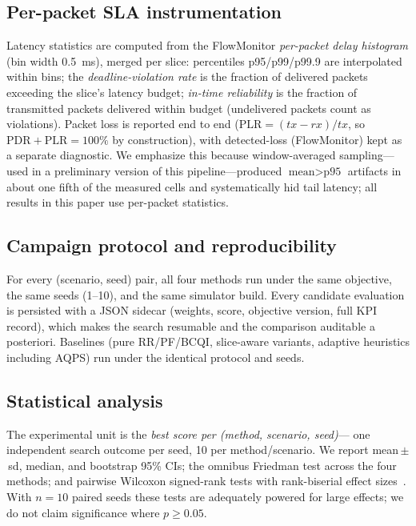 \documentclass[conference]{IEEEtran}
\newif\ifdraftpending
\newcommand{\pending}[1]{%
  \ifdraftpending{\color{red}\textbf{[PENDING-v2: #1]}}\else{}\fi}
\begin{document}
\subsection{Per-packet SLA instrumentation}
Latency statistics are computed from the FlowMonitor \emph{per-packet delay
histogram} (bin width 0.5~ms), merged per slice: percentiles p95/p99/p99.9 are
interpolated within bins; the \emph{deadline-violation rate} is the fraction of
delivered packets exceeding the slice's latency budget; \emph{in-time
reliability} is the fraction of transmitted packets delivered within budget
(undelivered packets count as violations). Packet loss is reported end to end
($\mathrm{PLR} = (tx - rx)/tx$, so $\mathrm{PDR} + \mathrm{PLR} = 100\%$ by
construction), with detected-loss (FlowMonitor) kept as a separate diagnostic.
We emphasize this because window-averaged sampling---used in a preliminary
version of this pipeline---produced $\text{mean} > \text{p95}$ artifacts in
about one fifth of the measured cells and systematically hid tail latency; all
results in this paper use per-packet statistics.

\subsection{Campaign protocol and reproducibility}
For every (scenario, seed) pair, all four methods run under the same objective,
the same seeds (1--10), and the same simulator build. Every candidate
evaluation is persisted with a JSON sidecar (weights, score, objective version,
full KPI record), which makes the search resumable and the comparison auditable
a posteriori. Baselines (pure RR/PF/BCQI, slice-aware variants, adaptive
heuristics including AQPS) run under the identical protocol and seeds.
\pending{total evaluation counts and total compute time of the campaign.}

\subsection{Statistical analysis}
The experimental unit is the \emph{best score per (method, scenario, seed)}---
one independent search outcome per seed, 10 per method/scenario. We report
mean\,$\pm$\,sd, median, and bootstrap 95\% CIs; the omnibus Friedman test
across the four methods; and pairwise Wilcoxon signed-rank tests with
rank-biserial effect sizes~\cite{demsar}. With $n = 10$ paired seeds these
tests are adequately powered for large effects; we do not claim significance
where $p \ge 0.05$.
\end{document}
